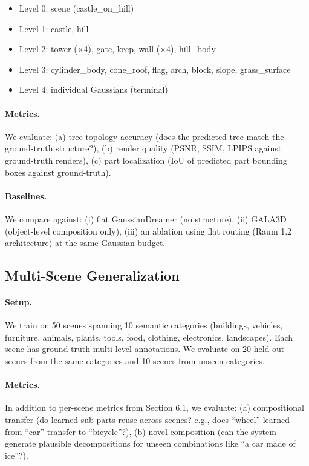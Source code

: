 \documentclass[11pt]{article}
\begin{document}
\begin{itemize}
    \item Level 0: scene (castle\_on\_hill)
    \item Level 1: castle, hill
    \item Level 2: tower ($\times$4), gate, keep, wall ($\times$4), hill\_body
    \item Level 3: cylinder\_body, cone\_roof, flag, arch, block, slope, grass\_surface
    \item Level 4: individual Gaussians (terminal)
\end{itemize}

\paragraph{Metrics.} We evaluate: (a) tree topology accuracy (does the predicted tree match the ground-truth structure?), (b) render quality (PSNR, SSIM, LPIPS against ground-truth renders), (c) part localization (IoU of predicted part bounding boxes against ground-truth).

\paragraph{Baselines.} We compare against: (i) flat GaussianDreamer (no structure), (ii) GALA3D (object-level composition only), (iii) an ablation using flat routing (Raum 1.2 architecture) at the same Gaussian budget.

\subsection{Multi-Scene Generalization}

\paragraph{Setup.} We train on 50 scenes spanning 10 semantic categories (buildings, vehicles, furniture, animals, plants, tools, food, clothing, electronics, landscapes). Each scene has ground-truth multi-level annotations. We evaluate on 20 held-out scenes from the same categories and 10 scenes from unseen categories.

\paragraph{Metrics.} In addition to per-scene metrics from Section 6.1, we evaluate: (a) compositional transfer (do learned sub-parts reuse across scenes? e.g., does ``wheel'' learned from ``car'' transfer to ``bicycle''?), (b) novel composition (can the system generate plausible decompositions for unseen combinations like ``a car made of ice''?).
\end{document}
